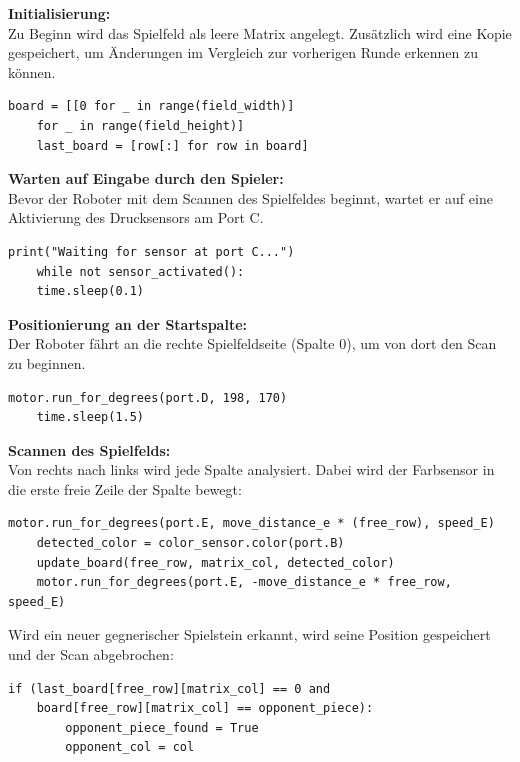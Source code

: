 \textbf{Initialisierung:}\\
Zu Beginn wird das Spielfeld als leere Matrix angelegt. Zusätzlich wird eine Kopie gespeichert, um Änderungen im Vergleich zur vorherigen Runde erkennen zu können.

\begin{lstlisting}[style=pythonstyle]
	board = [[0 for _ in range(field_width)] 
	for _ in range(field_height)]
	last_board = [row[:] for row in board]
\end{lstlisting}

\textbf{Warten auf Eingabe durch den Spieler:}\\
Bevor der Roboter mit dem Scannen des Spielfeldes beginnt, wartet er auf eine Aktivierung des Drucksensors am Port C.

\begin{lstlisting}[style=pythonstyle]
	print("Waiting for sensor at port C...")
	while not sensor_activated():
	time.sleep(0.1)
\end{lstlisting}

\textbf{Positionierung an der Startspalte:}\\
Der Roboter fährt an die rechte Spielfeldseite (Spalte 0), um von dort den Scan zu beginnen.

\begin{lstlisting}[style=pythonstyle]
	motor.run_for_degrees(port.D, 198, 170)
	time.sleep(1.5)
\end{lstlisting}

\textbf{Scannen des Spielfelds:}\\
Von rechts nach links wird jede Spalte analysiert. Dabei wird der Farbsensor in die erste freie Zeile der Spalte bewegt:

\begin{lstlisting}[style=pythonstyle]
	motor.run_for_degrees(port.E, move_distance_e * (free_row), speed_E)
	detected_color = color_sensor.color(port.B)
	update_board(free_row, matrix_col, detected_color)
	motor.run_for_degrees(port.E, -move_distance_e * free_row, speed_E)
\end{lstlisting}

Wird ein neuer gegnerischer Spielstein erkannt, wird seine Position gespeichert und der Scan abgebrochen:

\begin{lstlisting}[style=pythonstyle]
	if (last_board[free_row][matrix_col] == 0 and
	board[free_row][matrix_col] == opponent_piece):
		opponent_piece_found = True
		opponent_col = col
\end{lstlisting}

